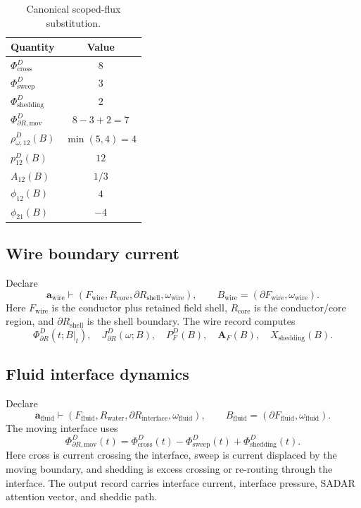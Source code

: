 \begin{table}[h]
\centering
\scriptsize
\caption{Canonical scoped-flux substitution.}
\begin{tabular}{l c}
\toprule
Quantity & Value\\
\midrule
$\Phi^D_{\mathrm{cross}}$ & $8$\\
$\Phi^D_{\mathrm{sweep}}$ & $3$\\
$\Phi^D_{\mathrm{shedding}}$ & $2$\\
$\Phi^D_{\partial R,\mathrm{mov}}$ & $8-3+2=7$\\
$\rho^D_{\omega,12}(B)$ & $\min(5,4)=4$\\
$p^D_{12}(B)$ & $12$\\
$A_{12}(B)$ & $1/3$\\
$\phi_{12}(B)$ & $4$\\
$\phi_{21}(B)$ & $-4$\\
\bottomrule
\end{tabular}
\label{tab:manual-boundary-current-substitution}
\end{table}

\subsection{Wire boundary current}\label{manual:boundary-current:wire}
Declare
\[
\mathbf a_{\mathrm{wire}}
\vdash
(F_{\mathrm{wire}},R_{\mathrm{core}},\partial R_{\mathrm{shell}},\omega_{\mathrm{wire}}),
\qquad
B_{\mathrm{wire}}=(\partial F_{\mathrm{wire}},\omega_{\mathrm{wire}}).
\]
Here \(F_{\mathrm{wire}}\) is the conductor plus retained field shell, \(R_{\mathrm{core}}\) is the conductor/core region, and \(\partial R_{\mathrm{shell}}\) is the shell boundary.
The wire record computes
\[
\Phi^D_{\partial R}(t;B|_t),
\quad
J^D_{\partial R}(\omega;B),
\quad
P^D_F(B),
\quad
\mathbf A_F(B),
\quad
X_{\mathrm{shedding}}(B).
\]

\subsection{Fluid interface dynamics}\label{manual:boundary-current:fluid}
Declare
\[
\mathbf a_{\mathrm{fluid}}
\vdash
(F_{\mathrm{fluid}},R_{\mathrm{water}},\partial R_{\mathrm{interface}},\omega_{\mathrm{fluid}}),
\qquad
B_{\mathrm{fluid}}=(\partial F_{\mathrm{fluid}},\omega_{\mathrm{fluid}}).
\]
The moving interface uses
\[
\Phi^D_{\partial R,\mathrm{mov}}(t)
=
\Phi^D_{\mathrm{cross}}(t)
-
\Phi^D_{\mathrm{sweep}}(t)
+
\Phi^D_{\mathrm{shedding}}(t).
\]
Here cross is current crossing the interface, sweep is current displaced by the moving boundary, and shedding is excess crossing or re-routing through the interface.
The output record carries interface current, interface pressure, SADAR attention vector, and sheddic path.

